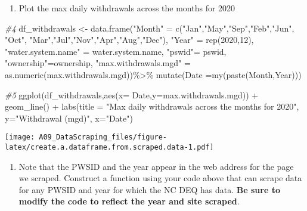 \documentclass[
]{article}
\newenvironment{Shaded}{\begin{snugshade}}{\end{snugshade}}
\newcommand{\AttributeTok}[1]{\textcolor[rgb]{0.77,0.63,0.00}{#1}}
\newcommand{\CommentTok}[1]{\textcolor[rgb]{0.56,0.35,0.01}{\textit{#1}}}
\newcommand{\DecValTok}[1]{\textcolor[rgb]{0.00,0.00,0.81}{#1}}
\newcommand{\FunctionTok}[1]{\textcolor[rgb]{0.00,0.00,0.00}{#1}}
\newcommand{\NormalTok}[1]{#1}
\newcommand{\OtherTok}[1]{\textcolor[rgb]{0.56,0.35,0.01}{#1}}
\newcommand{\SpecialCharTok}[1]{\textcolor[rgb]{0.00,0.00,0.00}{#1}}
\newcommand{\StringTok}[1]{\textcolor[rgb]{0.31,0.60,0.02}{#1}}
\providecommand{\tightlist}{%
  \setlength{\itemsep}{0pt}\setlength{\parskip}{0pt}}
\begin{document}
\begin{enumerate}
\def\labelenumi{\arabic{enumi}.}
\setcounter{enumi}{4}
\tightlist
\item
  Plot the max daily withdrawals across the months for 2020
\end{enumerate}

\begin{Shaded}
\begin{Highlighting}[]
\CommentTok{\#4}
\NormalTok{df\_withdrawals }\OtherTok{\textless{}{-}} \FunctionTok{data.frame}\NormalTok{(}\StringTok{"Month"} \OtherTok{=} \FunctionTok{c}\NormalTok{(}\StringTok{"Jan"}\NormalTok{,}\StringTok{"May"}\NormalTok{,}\StringTok{"Sep"}\NormalTok{,}\StringTok{"Feb"}\NormalTok{,}\StringTok{"Jun"}\NormalTok{, }\StringTok{"Oct"}\NormalTok{, }\StringTok{"Mar"}\NormalTok{,}\StringTok{"Jul"}\NormalTok{,}\StringTok{"Nov"}\NormalTok{,}\StringTok{"Apr"}\NormalTok{,}\StringTok{"Aug"}\NormalTok{,}\StringTok{"Dec"}\NormalTok{),}
                             \StringTok{"Year"} \OtherTok{=} \FunctionTok{rep}\NormalTok{(}\DecValTok{2020}\NormalTok{,}\DecValTok{12}\NormalTok{),}
                             \StringTok{"water.system.name"} \OtherTok{=}\NormalTok{ water.system.name,}
                             \StringTok{"pswid"}\OtherTok{=}\NormalTok{ pswid,}
                             \StringTok{"ownership"}\OtherTok{=}\NormalTok{ownership,}
                             \StringTok{"max.withdrawals.mgd"} \OtherTok{=} \FunctionTok{as.numeric}\NormalTok{(max.withdrawals.mgd))}\SpecialCharTok{\%\textgreater{}\%}
  \FunctionTok{mutate}\NormalTok{(}\AttributeTok{Date =}\FunctionTok{my}\NormalTok{(}\FunctionTok{paste}\NormalTok{(Month,Year)))}


\CommentTok{\#5}
\FunctionTok{ggplot}\NormalTok{(df\_withdrawals,}\FunctionTok{aes}\NormalTok{(}\AttributeTok{x=}\NormalTok{ Date,}\AttributeTok{y=}\NormalTok{max.withdrawals.mgd)) }\SpecialCharTok{+} 
  \FunctionTok{geom\_line}\NormalTok{() }\SpecialCharTok{+} 
  \FunctionTok{labs}\NormalTok{(}\AttributeTok{title =} \StringTok{"Max daily withdrawals across the months for 2020"}\NormalTok{,}
       \AttributeTok{y=}\StringTok{"Withdrawal (mgd)"}\NormalTok{,}
       \AttributeTok{x=}\StringTok{"Date"}\NormalTok{)}
\end{Highlighting}
\end{Shaded}

\texttt{[image: A09\_DataScraping\_files/figure-latex/create.a.dataframe.from.scraped.data-1.pdf]}

\begin{enumerate}
\def\labelenumi{\arabic{enumi}.}
\setcounter{enumi}{5}
\tightlist
\item
  Note that the PWSID and the year appear in the web address for the
  page we scraped. Construct a function using your code above that can
  scrape data for any PWSID and year for which the NC DEQ has data.
  \textbf{Be sure to modify the code to reflect the year and site
  scraped}.
\end{enumerate}
\end{document}
